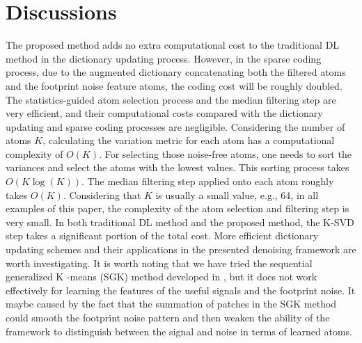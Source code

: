  
 
 
\section{Discussions}
The proposed method adds no extra computational cost to the traditional DL method in the dictionary updating process. However, in the sparse coding process, due to the augmented dictionary concatenating both the filtered atoms and the footprint noise feature atoms, the coding cost will be roughly doubled. The statistics-guided atom selection process and the median filtering step are very efficient, and their computational costs compared with the dictionary updating and sparse coding processes are negligible. Considering the number of atoms $K$, calculating the variation metric for each atom has a computational complexity of $O(K)$. For selecting those noise-free atoms, one needs to sort the variances and select the atoms with the lowest values. This sorting process takes $O(K\log(K))$. The median filtering step applied onto each atom roughly takes $O(K)$. Considering that $K$ is usually a small value, e.g., 64, in all examples of this paper, the complexity of the atom selection and filtering step is very small. In both traditional DL method and the proposed method, the K-SVD step takes a significant portion of the total cost. More efficient dictionary updating schemes and their applications in the presented denoising framework are worth investigating. It is worth noting that we have tried the sequential generalized K -means (SGK) method developed in \cite{yangkang2020sgk}, but it does not work effectively for learning the  features of the useful signals and the footprint noise. It maybe caused by the fact that the summation of patches in the SGK method could smooth the footprint noise pattern and then weaken the ability of the framework to distinguish between the signal and noise in terms of learned atoms. 

